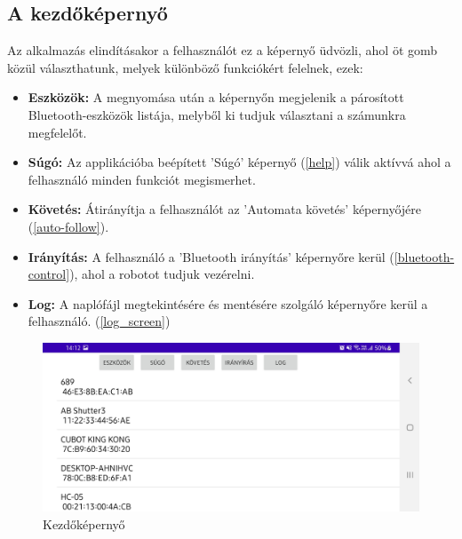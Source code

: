 \documentclass[]{thesis-ekf}
\theoremstyle{definition}
\begin{document}
\subsection{A kezdőképernyő}
Az alkalmazás elindításakor a felhasználót ez a képernyő üdvözli, ahol öt gomb közül választhatunk, melyek különböző funkciókért felelnek, ezek:
\begin{itemize}
	\item \textbf{Eszközök:} A megnyomása után a képernyőn megjelenik a párosított Bluetooth-eszközök listája, melyből ki tudjuk választani a számunkra megfelelőt.
	\item \textbf{Súgó:} Az applikációba beépített ’Súgó’ képernyő (\ref{help}) válik aktívvá ahol a felhasználó minden funkciót megismerhet.
	\item \textbf{Követés:} Átirányítja a felhasználót az ’Automata követés’ képernyőjére (\ref{auto-follow}).
	\item \textbf{Irányítás:} A felhasználó a ’Bluetooth irányítás’ képernyőre kerül (\ref{bluetooth-control}), ahol a robotot tudjuk vezérelni.
	\item \textbf{Log:} A naplófájl megtekintésére és mentésére szolgáló képernyőre kerül a felhasználó. (\ref{log_screen})
\end{itemize}
\begin{figure}[h]
	\centering
	\includegraphics[width=\columnwidth]{images/app_screen/home_screen}
	\caption{Kezdőképernyő}
	\label{home-screen}
\end{figure}
\end{document}
